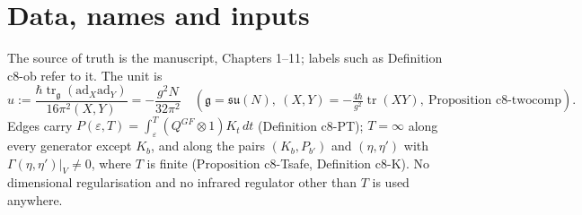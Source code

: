 \documentclass[11pt]{article}
\numberwithin{equation}{section}
\theoremstyle{plain}
\theoremstyle{definition}
\begin{document}
\begin{abstract}
with the special edge, generating functions, momentum injection for the position) and the specification of two independent engine routes with their gates complete the note; the scaling identity, $K=P^\dagger$, the twist and the value $\theta=-\tfrac13$ enter as cross-checks only.
\end{abstract}

\tableofcontents

\section{Data, names and inputs}
\label{sec:at-data}

The source of truth is the manuscript, Chapters 1--11; labels such as Definition c8-ob refer to it. The unit is
\[
u:=\frac{\hbar\operatorname{tr}_{\mathfrak g}(\mathrm{ad}_X\mathrm{ad}_Y)}{16\pi^2(X,Y)}=-\frac{g^2N}{32\pi^2}\quad(\mathfrak g=\mathfrak{su}(N),\ (X,Y)=-\tfrac{4\hbar}{g^2}\operatorname{tr}(XY),\ \text{Proposition c8-twocomp}).
\]
Edges carry $P(\varepsilon,T)=\int_\varepsilon^T(Q^{GF}\otimes1)K_t\,dt$ (Definition c8-PT); $T=\infty$ along every generator except $K_b$, and along the pairs $(K_b,P_{b'})$ and $(\eta,\eta')$ with $\Gamma(\eta,\eta')|_V\neq0$, where $T$ is finite (Proposition c8-Tsafe, Definition c8-K). No dimensional regularisation and no infrared regulator other than $T$ is used anywhere.
\end{document}
